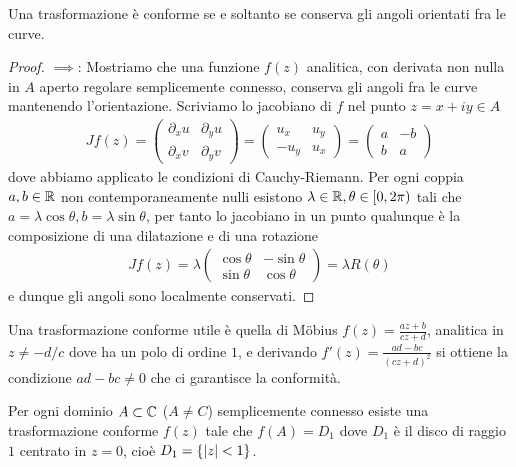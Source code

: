 \begin{theorem}[  ]
  Una trasformazione è conforme se e soltanto se conserva gli angoli orientati fra le curve.
\end{theorem}
\begin{proof}
  $ \implies $: Mostriamo che una funzione $ f(z) $ analitica, con derivata non nulla in $ A $ aperto regolare semplicemente connesso, conserva gli 
  angoli fra le curve mantenendo l'orientazione. Scriviamo lo jacobiano di $ f $ nel punto $ z = x + iy \in A $ 
  \begin{align}
    J\!f(z) = 
    \begin{pmatrix}
      \partial_x u & \partial_y u \\
      \partial_x v & \partial_y v
    \end{pmatrix}
    = 
    \begin{pmatrix}
      u_x & u_y \\
      -u_y & u_x
    \end{pmatrix}
    = 
    \begin{pmatrix}
      a & -b \\
      b & a
    \end{pmatrix}
  \end{align}
  dove abbiamo applicato le condizioni di Cauchy-Riemann. Per ogni coppia $ a,b \in \mathbb{R} $ non contemporaneamente nulli 
  esistono $ \lambda \in \mathbb{R}, \theta \in [0,2\pi) $ tali che 
  $ a = \lambda \cos \theta, b = \lambda \sin \theta $, per tanto lo jacobiano in un punto qualunque è la composizione di una dilatazione 
  e di una rotazione
  \begin{align}
    J\!f(z) = \lambda 
    \begin{pmatrix}
      \cos \theta & -\sin \theta \\
      \sin \theta & \cos \theta
    \end{pmatrix}
    = \lambda R(\theta)
  \end{align}
  e dunque gli angoli sono localmente conservati.
\end{proof}

\begin{example}
  Una trasformazione conforme utile è quella di Möbius $ f(z) = \frac{az + b}{cz + d} $, analitica in $ z \neq -d/c $ dove ha un 
  polo di ordine $ 1 $, e derivando $ f'(z) = \frac{ad - bc}{(cz + d)^2} $ si ottiene la condizione $ ad - bc \neq 0 $ che ci garantisce la conformità.
\end{example}

\begin{theorem}[ di Riemann ]
  Per ogni dominio $ A\subset \mathbb{C} $ ($ A \neq C $) semplicemente connesso esiste una trasformazione conforme $ f(z) $ tale che $ f(A) = D_1 $ 
  dove $ D_1 $ è il disco di raggio $ 1 $ centrato in $ z = 0 $, cioè $ D_1 = \{\left|{z}\right| < 1\} $.
\end{theorem}

